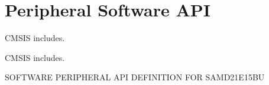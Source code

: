 \hypertarget{group___s_a_m_d21_e15_b_u__api}{}\section{Peripheral Software A\+PI}
\label{group___s_a_m_d21_e15_b_u__api}


C\+M\+S\+IS includes.  


C\+M\+S\+IS includes. 

S\+O\+F\+T\+W\+A\+RE P\+E\+R\+I\+P\+H\+E\+R\+AL A\+PI D\+E\+F\+I\+N\+I\+T\+I\+ON F\+OR S\+A\+M\+D21\+E15\+BU 